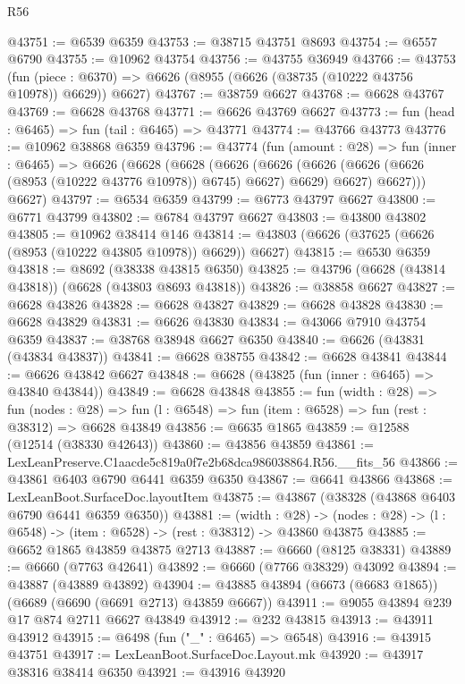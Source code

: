 \begin{lexlean}{R56}
\begin{coremodule}
@43751 := @6539 @6359
@43753 := @38715 @43751 @8693
@43754 := @6557 @6790
@43755 := @10962 @43754
@43756 := @43755 @36949
@43766 := @43753
    (fun (piece : @6370) => @6626 (@8955 (@6626 (@38735 (@10222 @43756 @10978)) @6629)) @6627)
@43767 := @38759 @6627
@43768 := @6628 @43767
@43769 := @6628 @43768
@43771 := @6626 @43769 @6627
@43773 := fun (head : @6465) => fun (tail : @6465) => @43771
@43774 := @43766 @43773
@43776 := @10962 @38868 @6359
@43796 := @43774
    (fun (amount : @28) =>
    fun (inner : @6465) =>
    @6626
      (@6628
        (@6628
          (@6626
            (@6626 (@6626 (@6626 (@6626 (@8953 (@10222 @43776 @10978)) @6745) @6627) @6629) @6627)
            @6627)))
      @6627)
@43797 := @6534 @6359
@43799 := @6773 @43797 @6627
@43800 := @6771 @43799
@43802 := @6784 @43797 @6627
@43803 := @43800 @43802
@43805 := @10962 @38414 @146
@43814 := @43803 (@6626 (@37625 (@6626 (@8953 (@10222 @43805 @10978)) @6629)) @6627)
@43815 := @6530 @6359
@43818 := @8692 (@38338 @43815 @6350)
@43825 := @43796 (@6628 (@43814 @43818)) (@6628 (@43803 @8693 @43818))
@43826 := @38858 @6627
@43827 := @6628 @43826
@43828 := @6628 @43827
@43829 := @6628 @43828
@43830 := @6628 @43829
@43831 := @6626 @43830
@43834 := @43066 @7910 @43754 @6359
@43837 := @38768 @38948 @6627 @6350
@43840 := @6626 (@43831 (@43834 @43837))
@43841 := @6628 @38755
@43842 := @6628 @43841
@43844 := @6626 @43842 @6627
@43848 := @6628 (@43825 (fun (inner : @6465) => @43840 @43844))
@43849 := @6628 @43848
@43855 := fun (width : @28) =>
  fun (nodes : @28) => fun (l : @6548) => fun (item : @6528) => fun (rest : @38312) => @6628 @43849
@43856 := @6635 @1865
@43859 := @12588 (@12514 (@38330 @42643))
@43860 := @43856 @43859
@43861 := LexLeanPreserve.C1aacde5c819a0f7e2b68dca986038864.R56.__fits_56
@43866 := @43861 @6403 @6790 @6441 @6359 @6350
@43867 := @6641 @43866
@43868 := LexLeanBoot.SurfaceDoc.layoutItem
@43875 := @43867 (@38328 (@43868 @6403 @6790 @6441 @6359 @6350))
@43881 := (width : @28) ->
  (nodes : @28) -> (l : @6548) -> (item : @6528) -> (rest : @38312) -> @43860 @43875
@43885 := @6652 @1865 @43859 @43875 @2713
@43887 := @6660 (@8125 @38331)
@43889 := @6660 (@7763 @42641)
@43892 := @6660 (@7766 @38329) @43092
@43894 := @43887 (@43889 @43892)
@43904 := @43885 @43894 (@6673 (@6683 @1865)) (@6689 (@6690 (@6691 @2713) @43859 @6667))
@43911 := @9055 @43894 @239 @17 @874 @2711 @6627 @43849
@43912 := @232 @43815
@43913 := @43911 @43912
@43915 := @6498 (fun ("_" : @6465) => @6548)
@43916 := @43915 @43751
@43917 := LexLeanBoot.SurfaceDoc.Layout.mk
@43920 := @43917 @38316 @38414 @6350
@43921 := @43916 @43920

\end{coremodule}
\end{lexlean}

